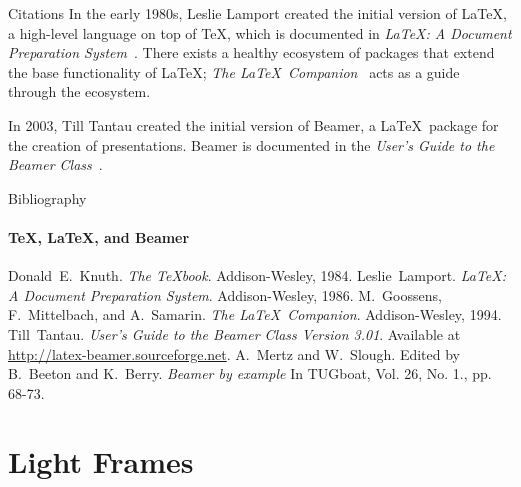 \documentclass{beamer}
\begin{document}
\begin{darkframes}
\begin{frame}[label=citations]{Citations}
    In the early 1980s, Leslie Lamport created the initial version
    of \LaTeX, a high-level language on top of \TeX, which is
    documented in \emph{\LaTeX : A Document Preparation
      System}~\cite{lamport94}. There exists a healthy ecosystem of
    packages that extend the base functionality of \LaTeX;
    \emph{The \LaTeX\ Companion}~\cite{MG94} acts as a guide
    through the ecosystem.

    In 2003, Till Tantau created the initial version of Beamer, a
    \LaTeX\ package for the creation of presentations. Beamer is
    documented in the \emph{User's Guide to the Beamer
      Class}~\cite{tantau04}.
  \end{frame}

  \begin{frame}[label=bibliography]{Bibliography}
    \framesubtitle{\TeX, \LaTeX, and Beamer}
    \begin{thebibliography}{9}
      Donald~E.~Knuth.
      \emph{The \TeX book}.
      Addison-Wesley, 1984.
      Leslie~Lamport.
      \emph{\LaTeX : A Document Preparation System}.
      Addison-Wesley, 1986.
      M.~Goossens, F.~Mittelbach, and A.~Samarin.
      \emph{The \LaTeX\ Companion}.
      Addison-Wesley, 1994.
      Till~Tantau.
      \emph{User's Guide to the Beamer Class Version 3.01}.
      Available at \url{http://latex-beamer.sourceforge.net}.
      A.~Mertz and W.~Slough.
      Edited by B.~Beeton and K.~Berry.
      \emph{Beamer by example} In TUGboat,
      Vol. 26, No. 1., pp. 68-73.
    \end{thebibliography}
  \end{frame}

\end{darkframes}

\section{Light Frames}
\end{document}
